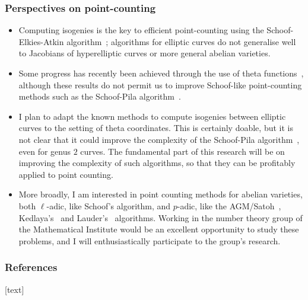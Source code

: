 \documentclass[10pt]{beamer}
\newcommand{\0}{\mathcal{O}}  %
\begin{document}

{

\begin{frame}
  \frametitle{Perspectives on point-counting}
  
  \begin{itemize}
  \item Computing isogenies is the key to efficient point-counting
    using the Schoof-Elkies-Atkin algorithm~\cite{schoof95};
    algorithms for elliptic curves do not generalise well to Jacobians
    of hyperelliptic curves or more general abelian varieties.
  \item Some progress has recently been achieved through the use of
    theta
    functions~\cite{faugere+lubicz+robert10,lubicz+robert10,robert},
    although these results do not permit us to improve Schoof-like
    point-counting methods such as the Schoof-Pila
    algorithm~\cite{pila90}.
  \item I plan to adapt the known methods to compute isogenies between
    elliptic curves to the setting of theta coordinates. This is
    certainly doable, but it is not clear that it could improve the
    complexity of the Schoof-Pila algorithm~\cite{pila90}, even for
    genus $2$ curves. The fundamental part of this research will be on
    improving the complexity of such algorithms, so that they can be
    profitably applied to point counting.
  \item More broadly, I am interested in point counting methods for
    abelian varieties, both $\ell$-adic, like Schoof's algorithm, and
    $p$-adic, like the
    AGM/Satoh~\cite{satoh00,fouquet+gaudry+harley00,mestre00,gaudry02,mestre02,lercier+lubicz06},
    Kedlaya's~\cite{kedlaya01,kedlaya04,denef+vercauteren06,castryck+denef+vercauteren07,harvey07}
    and Lauder's~\cite{lauder04,lauder+wan06} algorithms. Working in
    the number theory group of the Mathematical Institute would be an
    excellent opportunity to study these problems, and I will
    enthusiastically participate to the group's research.
  \end{itemize}

\end{frame}
}

\begin{frame}[allowframebreaks]
  \frametitle{References}
  
  [text]
  
  
\end{frame}
\end{document}
